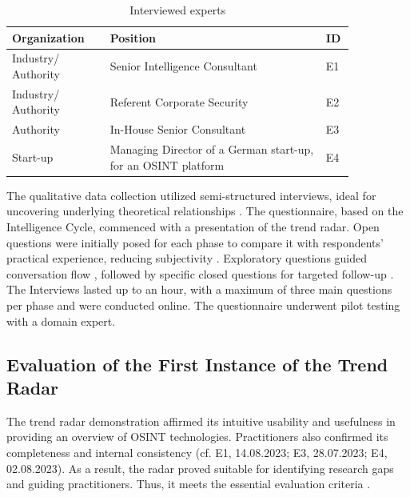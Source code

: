 \documentclass[10pt]{article}
\begin{document}
\begin{table}[htbp]
    \caption{Interviewed experts}
    \begin{tabular}{p{0.25\linewidth}p{0.55\linewidth}p{0.05\linewidth}}
        \toprule
        \textbf{Organization} & \textbf{Position}                                             & \textbf{ID} \\
        \hline
        Industry/ Authority   & Senior Intelligence Consultant                                & E1          \\
        \hline
        Industry/ Authority   & Referent Corporate Security                                   & E2          \\
        \hline
        Authority             & In-House Senior Consultant                                    & E3          \\
        \hline
        Start-up              & Managing Director of a German start-up, for an OSINT platform & E4          \\
        \bottomrule
    \end{tabular}
    \label{tab:experts}
\end{table}
The qualitative data collection utilized semi-structured interviews, ideal for uncovering underlying theoretical relationships \cite{Bogner.2014}. The questionnaire, based on the Intelligence Cycle, commenced with a presentation of the trend radar. Open questions were initially posed for each phase to compare it with respondents' practical experience, reducing subjectivity \cite{Saunders.2012}. Exploratory questions guided conversation flow \cite{Saunders.2012}, followed by specific closed questions for targeted follow-up \cite{Saunders.2012}. The Interviews lasted up to an hour, with a maximum of three main questions per phase \cite{Bogner.2014} and were conducted online. The questionnaire underwent pilot testing with a domain expert.

\subsection{Evaluation of the First Instance of the Trend Radar}

The trend radar demonstration affirmed its intuitive usability and usefulness in providing an overview of OSINT technologies. Practitioners also confirmed its completeness and internal consistency (cf. E1, 14.08.2023; E3, 28.07.2023; E4, 02.08.2023). As a result, the radar proved suitable for identifying research gaps and guiding practitioners. Thus, it meets the essential evaluation criteria \cite{Sonnenberg.2012}.
\end{document}
